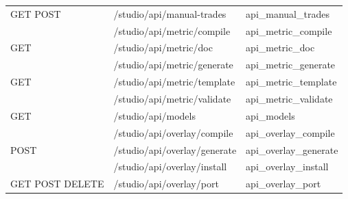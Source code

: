 \begin{longtable}{@{}L{17mm}L{74mm}L{45mm}@{}}
{\scriptsize\sffamily GET POST} & {\ttfamily\scriptsize /\allowbreak studio/\allowbreak api/\allowbreak manual-trades} & {\ttfamily\scriptsize api\_\allowbreak{}manual\_\allowbreak{}trades} \\
 & {\ttfamily\scriptsize /\allowbreak studio/\allowbreak api/\allowbreak metric/\allowbreak compile} & {\ttfamily\scriptsize api\_\allowbreak{}metric\_\allowbreak{}compile} \\
{\scriptsize\sffamily GET} & {\ttfamily\scriptsize /\allowbreak studio/\allowbreak api/\allowbreak metric/\allowbreak doc} & {\ttfamily\scriptsize api\_\allowbreak{}metric\_\allowbreak{}doc} \\
 & {\ttfamily\scriptsize /\allowbreak studio/\allowbreak api/\allowbreak metric/\allowbreak generate} & {\ttfamily\scriptsize api\_\allowbreak{}metric\_\allowbreak{}generate} \\
{\scriptsize\sffamily GET} & {\ttfamily\scriptsize /\allowbreak studio/\allowbreak api/\allowbreak metric/\allowbreak template} & {\ttfamily\scriptsize api\_\allowbreak{}metric\_\allowbreak{}template} \\
 & {\ttfamily\scriptsize /\allowbreak studio/\allowbreak api/\allowbreak metric/\allowbreak validate} & {\ttfamily\scriptsize api\_\allowbreak{}metric\_\allowbreak{}validate} \\
{\scriptsize\sffamily GET} & {\ttfamily\scriptsize /\allowbreak studio/\allowbreak api/\allowbreak models} & {\ttfamily\scriptsize api\_\allowbreak{}models} \\
 & {\ttfamily\scriptsize /\allowbreak studio/\allowbreak api/\allowbreak overlay/\allowbreak compile} & {\ttfamily\scriptsize api\_\allowbreak{}overlay\_\allowbreak{}compile} \\
{\scriptsize\sffamily POST} & {\ttfamily\scriptsize /\allowbreak studio/\allowbreak api/\allowbreak overlay/\allowbreak generate} & {\ttfamily\scriptsize api\_\allowbreak{}overlay\_\allowbreak{}generate} \\
 & {\ttfamily\scriptsize /\allowbreak studio/\allowbreak api/\allowbreak overlay/\allowbreak install} & {\ttfamily\scriptsize api\_\allowbreak{}overlay\_\allowbreak{}install} \\
{\scriptsize\sffamily GET POST DELETE} & {\ttfamily\scriptsize /\allowbreak studio/\allowbreak api/\allowbreak overlay/\allowbreak port} & {\ttfamily\scriptsize api\_\allowbreak{}overlay\_\allowbreak{}port} \\

\end{longtable}
